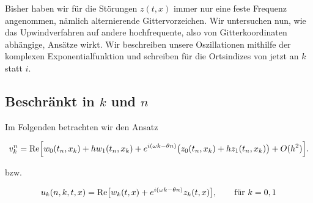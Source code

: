 
Bisher haben wir für die Störungen $z(t,x)$ immer nur eine feste Frequenz angenommen, nämlich alternierende Gittervorzeichen.
Wir untersuchen nun, wie das Upwindverfahren auf andere hochfrequente, also von Gitterkoordinaten abhängige, Ansätze wirkt.
Wir beschreiben unsere Oszillationen mithilfe der komplexen Exponentialfunktion und schreiben für die Ortsindizes von jetzt an $k$ statt $i$.

\subsection*{Beschränkt in $k$ und $n$}

Im Folgenden betrachten wir den Ansatz

\begin{align}\label{eq:exp:ansatz}
v^n_k = \operatorname{Re} \Bigl[ w_0(t_n, x_k) + h w_1(t_n, x_k) + e^{i(\omega k - \theta n)} \bigl( z_0(t_n, x_k) + h z_1(t_n, x_k) \bigr) + O(h^2) \Bigr].
\end{align}

bzw.

\begin{align}
u_k(n, k, t, x) = \operatorname{Re} \bigl[ w_k(t, x) + e^{i (\omega k - \theta n)} z_k(t, x) \bigr], \qquad \text{für $k = 0,1$}
\end{align}

